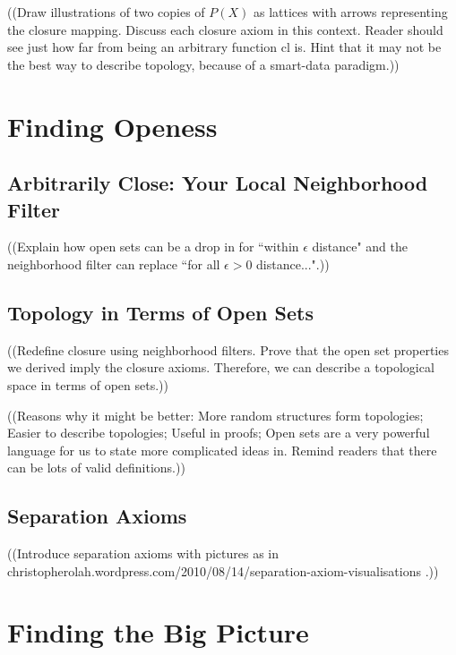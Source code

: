 \documentclass{report}
\newcommand{\cl}{\mathrm{cl}}
\begin{document}
((Draw illustrations of two copies of $P(X)$ as lattices with arrows representing the closure mapping. Discuss each closure axiom in this context. Reader should see just how far from being an arbitrary function $\cl$ is. Hint that it may not be the best way to describe topology, because of a smart-data paradigm.))

\chapter{Finding Openess}

\section{Arbitrarily Close: Your Local Neighborhood Filter}

((Explain how open sets can be a drop in for ``within $\epsilon$ distance" and the neighborhood filter can replace ``for all $\epsilon > 0$ distance...".))

\section{Topology in Terms of Open Sets}

((Redefine closure using neighborhood filters. Prove that the open set properties we derived imply the closure axioms. Therefore, we can describe a topological space in terms of open sets.))

((Reasons why it might be better: More random structures form topologies; Easier to describe topologies; Useful in proofs; Open sets are a very powerful language for us to state more complicated ideas in. Remind readers that there can be lots of valid definitions.))

\section{Separation Axioms}

((Introduce separation axioms with pictures as in\\ christopherolah.wordpress.com/2010/08/14/separation-axiom-visualisations .))

\chapter{Finding the Big Picture}
\end{document}
